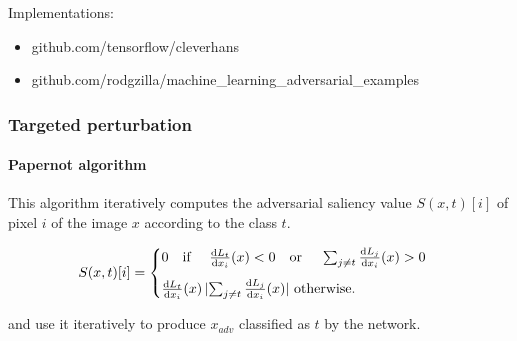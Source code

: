 \documentclass[9pt]{beamer}
\begin{document}
\begin{frame}
  \medskip

  Implementations:
  \begin{itemize}
    \item github.com/tensorflow/cleverhans
    \item github.com/rodgzilla/machine\_learning\_adversarial\_examples
  \end{itemize}

\end{frame}

\appendix

\begin{frame}
  \frametitle{Targeted perturbation}

  \framesubtitle{Papernot algorithm}

  This algorithm iteratively computes the adversarial saliency value
  $S(x, t)[i]$ of pixel $i$ of the image $x$ according to the class
  $t$.

  \medskip

  \[
  S(x, t)[i] =
  \begin{cases}
    0 \text{\quad if \quad} \frac{\mathrm{d} L_{t}}{\mathrm{d} x_{i}}(x) < 0
    \text{\quad or \quad} \sum_{j \neq t} \frac{\mathrm{d} L_{j}}{\mathrm{d} x_{i}}(x)
    > 0 \\[0.3cm]
    \frac{\mathrm{d} L_{t}}{\mathrm{d} x_{i}}(x) \, \lvert \sum_{j \neq
      t} \frac{\mathrm{d} L_{j}}{\mathrm{d} x_{i}}(x) \rvert \text{ otherwise.}
  \end{cases}
  \]

  \medskip

  and use it iteratively to produce $x_{adv}$ classified as $t$ by the
  network.

\end{frame}
\end{document}
